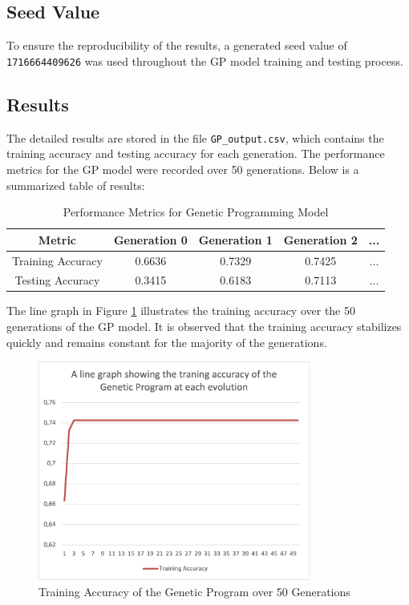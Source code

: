 \documentclass{article}
\begin{document}
\subsection{Seed Value}
To ensure the reproducibility of the results, a generated seed value of \texttt{1716664409626} was used throughout the GP model training and testing process.

\subsection{Results}
The detailed results are stored in the file \texttt{GP\_output.csv}, which contains the training accuracy and testing accuracy for each generation. The performance metrics for the GP model were recorded over 50 generations. Below is a summarized table of results:

\begin{table}[h!]
    \centering
    \label{tab:gp_results}
    \begin{tabular}{|c|c|c|c|c|}
        \hline
        \textbf{Metric} & \textbf{Generation 0} & \textbf{Generation 1} & \textbf{Generation 2} & \textbf{...} \\
        \hline
        Training Accuracy & 0.6636 & 0.7329 & 0.7425 & ... \\
        Testing Accuracy & 0.3415 & 0.6183 & 0.7113 & ... \\
        \hline
    \end{tabular}
    \caption{Performance Metrics for Genetic Programming Model}
\end{table}

The line graph in Figure \ref{fig:gp_training_accuracy} illustrates the training accuracy over the 50 generations of the GP model. It is observed that the training accuracy stabilizes quickly and remains constant for the majority of the generations.

\begin{figure}[h!]
    \centering
    \includegraphics[width=0.8\textwidth]{GP_training_results.png}
    \caption{Training Accuracy of the Genetic Program over 50 Generations}
    \label{fig:gp_training_accuracy}
\end{figure}
\end{document}

